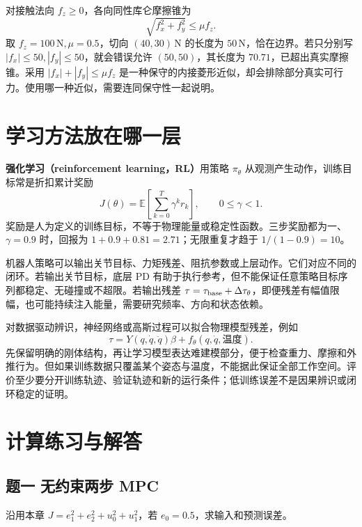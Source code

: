 对接触法向 $f_z\ge0$，各向同性库仑摩擦锥为
\begin{equation}
\sqrt{f_x^2+f_y^2}\le\mu f_z.
\end{equation}
取 $f_z=100\,\mathrm N,\mu=0.5$，切向 $(40,30)\,\mathrm N$ 的长度为 $50\,\mathrm N$，恰在边界。若只分别写 $|f_x|\le50,|f_y|\le50$，就会错误允许 $(50,50)$，其长度为 $70.71$，已超出真实摩擦锥。采用 $|f_x|+|f_y|\le\mu f_z$ 是一种保守的内接菱形近似，却会排除部分真实可行力。使用哪一种近似，需要连同保守性一起说明。

\section{学习方法放在哪一层}

\textbf{强化学习（reinforcement learning，RL）}用策略 $\pi_\theta$ 从观测产生动作，训练目标常是折扣累计奖励
\begin{equation}
J(\theta)=\mathbb E\left[\sum_{k=0}^{T}\gamma^k r_k\right],\qquad0\le\gamma<1.
\end{equation}
奖励是人为定义的训练目标，不等于物理能量或稳定性函数。三步奖励都为一、$\gamma=0.9$ 时，回报为 $1+0.9+0.81=2.71$；无限重复才趋于 $1/(1-0.9)=10$。\cite{sutton}

机器人策略可以输出关节目标、力矩残差、阻抗参数或上层动作。它们对应不同的闭环。若输出关节目标，底层 PD 有助于执行参考，但不能保证任意策略目标序列都稳定、无碰撞或不超限。若输出残差 $\tau=\tau_{\rm base}+\Delta\tau_\theta$，即便残差有幅值限幅，也可能持续注入能量，需要研究频率、方向和状态依赖。

对数据驱动辨识，神经网络或高斯过程可以拟合物理模型残差，例如
\begin{equation}
\tau=Y(q,\dot q,\ddot q)\beta+f_\theta(q,\dot q,\text{温度}).
\end{equation}
先保留明确的刚体结构，再让学习模型表达难建模部分，便于检查重力、摩擦和外推行为。但如果训练数据只覆盖某个姿态与温度，不能据此保证全部工作空间。评价至少要分开训练轨迹、验证轨迹和新的运行条件；低训练误差不是因果辨识或闭环稳定的证明。

\section{计算练习与解答}

\subsection*{题一 无约束两步 MPC}
沿用本章 $J=e_1^2+e_2^2+u_0^2+u_1^2$，若 $e_0=0.5$，求输入和预测误差。

